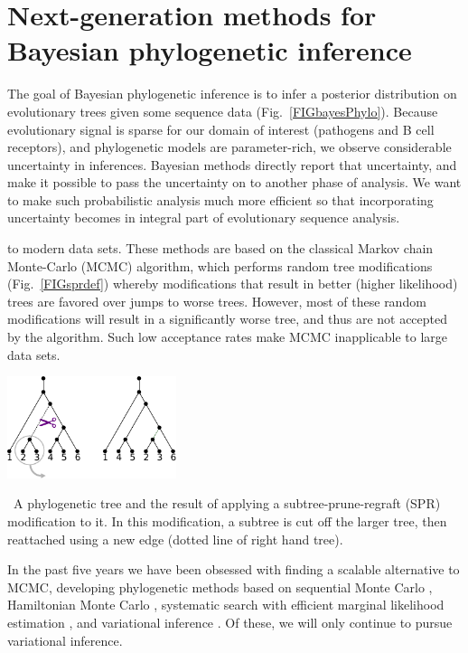 \documentclass[nobib]{tufte-handout}
\begin{document}
\section{Next-generation methods for Bayesian phylogenetic inference}
\vspace{-0.3cm}
The goal of Bayesian phylogenetic inference is to infer a posterior distribution on evolutionary trees given some sequence data (Fig.~\ref{FIGbayesPhylo}).
Because evolutionary signal is sparse for our domain of interest (pathogens and B cell receptors), and phylogenetic models are parameter-rich, we observe considerable uncertainty in inferences.
Bayesian methods directly report that uncertainty, and make it possible to pass the uncertainty on to another phase of analysis.
We want to make such probabilistic analysis much more efficient so that incorporating uncertainty becomes in integral part of evolutionary sequence analysis.

 to modern data sets.
These methods are based on the classical Markov chain Monte-Carlo (MCMC) algorithm, which performs random tree modifications (Fig.~\ref{FIGsprdef}) whereby modifications that result in better (higher likelihood) trees are favored over jumps to worse trees.
However, most of these random modifications will result in a significantly worse tree, and thus are not accepted by the algorithm.
Such low acceptance rates make MCMC inapplicable to large data sets.

\begin{marginfigure}[0.in]%
  \includegraphics[width=1.95in]{spr-definition}
  \caption{\
    A phylogenetic tree and the result of applying a subtree-prune-regraft (SPR) modification to it.
    In this modification, a subtree is cut off the larger tree, then reattached using a new edge (dotted line of right hand tree).
    }
  \label{FIGsprdef}
\end{marginfigure}%

In the past five years we have been obsessed with finding a scalable alternative to MCMC, developing phylogenetic methods based on
sequential Monte Carlo \cite{Dinh2017-sh,Fourment2017-an,Claywell2018-zg},
Hamiltonian Monte Carlo \cite{Dinh2017-oj},
systematic search \cite{Whidden2018-db} with efficient marginal likelihood estimation \cite{Fourment2018-xx},
and variational inference \cite{Zhang2018-lw,Zhang2018-mm}.
Of these, we will only continue to pursue variational inference.
\end{document}
